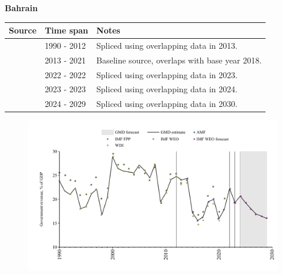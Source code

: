 \documentclass[12pt,a4paper,landscape]{article}
\begin{document}
\begin{adjustbox}{max totalsize={\paperwidth}{\paperheight},center}
\begin{minipage}[t][\textheight][t]{\textwidth}
\vspace*{0.5cm}
{}
\begin{center}
{\Large\bfseries Bahrain}
\end{center}
\vspace{0.5cm}
\begin{table}[H]
\centering
\small
\begin{tabular}{|l|l|l|}
\hline
\textbf{Source} & \textbf{Time span} & \textbf{Notes} \\
\hline
\rowcolor{white}\cite{WDI}& 1990 - 2012 &Spliced using overlapping data in 2013.\\
\rowcolor{lightgray}\cite{AMF}& 2013 - 2021 &Baseline source, overlaps with base year 2018.\\
\rowcolor{white}\cite{IMF_WEO}& 2022 - 2022 &Spliced using overlapping data in 2023.\\
\rowcolor{lightgray}\cite{IMF_FPP}& 2023 - 2023 &Spliced using overlapping data in 2024.\\
\rowcolor{white}\cite{IMF_WEO_forecast}& 2024 - 2029 &Spliced using overlapping data in 2030.\\
\hline
\end{tabular}
\end{table}
\begin{figure}[H]
\centering
\includegraphics[width=\textwidth,height=0.6\textheight,keepaspectratio]{graphs/BHR_govrev_GDP.pdf}
\end{figure}
\end{minipage}
\end{adjustbox}
\end{document}
